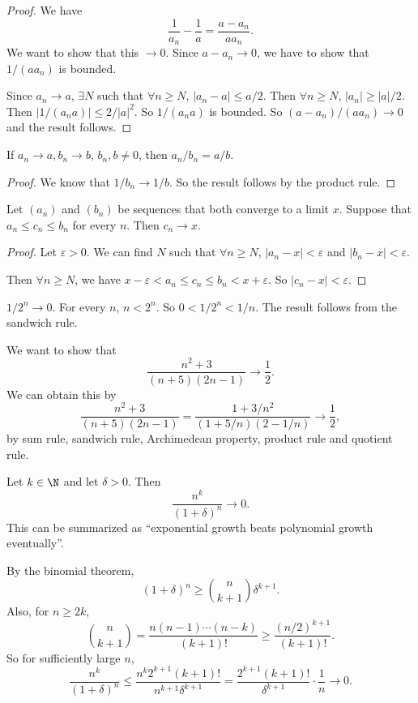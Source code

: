 \documentclass[a4paper]{article}
\begin{document}
\begin{proof}
  We have
  \[
    \frac{1}{a_n} - \frac{1}{a} = \frac{a - a_n}{aa_n}.
  \]
  We want to show that this $\to 0$. Since $a - a_n \to 0$, we have to show that $1/(aa_n)$ is bounded.

  Since $a_n \to a$, $\exists N$ such that $\forall n\geq N$, $|a_n - a| \leq a/2$. Then $\forall n\geq N$, $|a_n| \geq |a|/2$. Then $|1/(a_na)| \leq 2/|a|^2$. So $1/(a_na)$ is bounded. So $(a - a_n)/(aa_n)\to 0$ and the result follows.
\end{proof}

\begin{cor}
  If $a_n \to a, b_n \to b$, $b_n, b\not= 0$, then $a_n/b_n = a/b$.
\end{cor}

\begin{proof}
  We know that $1/b_n \to 1/b$. So the result follows by the product rule.
\end{proof}

\begin{lemma}
  Let $(a_n)$ and $(b_n)$ be sequences that both converge to a limit $x$. Suppose that $a_n \leq c_n \leq b_n$ for every $n$. Then $c_n \to x$.
\end{lemma}

\begin{proof}
  Let $\varepsilon > 0$. We can find $N$ such that $\forall n \geq N$, $|a_n - x| < \varepsilon$ and $|b_n - x| < \varepsilon$.

  Then $\forall n\geq N$, we have $x - \varepsilon < a_n \leq c_n \leq b_n < x + \varepsilon$. So $|c_n - x| < \varepsilon$.
\end{proof}

\begin{eg}
  $1/2^n \to 0$. For every $n$, $n < 2^n$. So $0 < 1/2^n < 1/n$. The result follows from the sandwich rule.
\end{eg}
\begin{eg}
  We want to show that
  \[
    \frac{n^2 + 3}{(n + 5)(2n - 1)} \to \frac{1}{2}.
  \]
  We can obtain this by
  \[
    \frac{n^2 + 3}{(n + 5)(2n - 1)} = \frac{1 + 3/n^2}{(1 + 5/n)(2 - 1/n)} \to \frac{1}{2},
  \]
  by sum rule, sandwich rule, Archimedean property, product rule and quotient rule.
\end{eg}

\begin{eg}
  Let $k\in \N$ and let $\delta > 0$. Then
  \[
    \frac{n^k}{(1 + \delta)^n}\to 0.
  \]
  This can be summarized as ``exponential growth beats polynomial growth eventually''.

  By the binomial theorem,
  \[
    (1 + \delta)^n \geq \binom{n}{k + 1}\delta^{k + 1}.
  \]
  Also, for $n\geq 2k$,
  \[
    \binom{n}{k + 1} = \frac{n(n - 1)\cdots(n - k)}{(k + 1)!} \geq \frac{(n/2)^{k + 1}}{(k + 1)!}.
  \]
  So for sufficiently large $n$,
  \[
    \frac{n^k}{(1 + \delta)^n} \leq \frac{n^k 2^{k + 1} (k+1)!}{n^{k + 1}\delta^{k + 1}} = \frac{2^{k + 1} (k + 1)!}{\delta^{k + 1}} \cdot \frac{1}{n} \to 0.
  \]
\end{eg}
\end{document}
